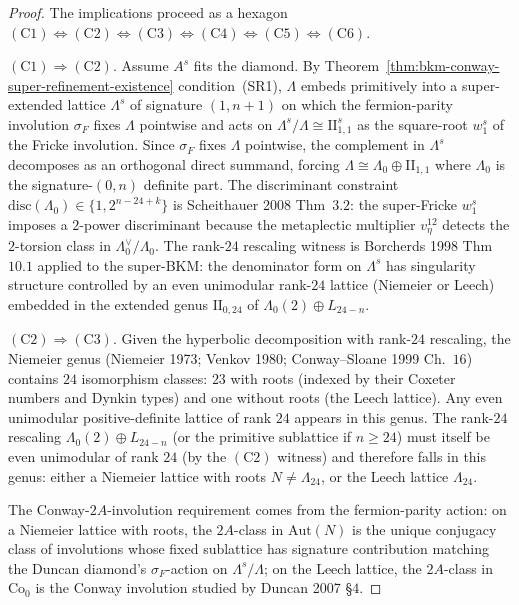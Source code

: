 \begin{proof}[Proof]
The implications proceed as a hexagon
$(\mathrm{C}1)\Leftrightarrow(\mathrm{C}2)\Leftrightarrow(\mathrm{C}3)\Leftrightarrow(\mathrm{C}4)\Leftrightarrow(\mathrm{C}5)\Leftrightarrow(\mathrm{C}6)$.

$(\mathrm{C}1)\Rightarrow(\mathrm{C}2)$.
Assume $A^{s}$ fits the diamond. By
Theorem~\ref{thm:bkm-conway-super-refinement-existence} condition~(SR1),
$\Lambda$ embeds primitively into a super-extended lattice
$\Lambda^{s}$ of signature $(1, n+1)$ on which the fermion-parity
involution $\sigma_F$ fixes $\Lambda$ pointwise and acts on
$\Lambda^{s}/\Lambda \cong \mathrm{II}_{1,1}^{s}$ as the square-root
$w_1^{s}$ of the Fricke involution. Since $\sigma_F$ fixes $\Lambda$
pointwise, the complement in $\Lambda^{s}$ decomposes as an orthogonal
direct summand, forcing $\Lambda \cong \Lambda_0\oplus\mathrm{II}_{1,1}$
where $\Lambda_0$ is the signature-$(0, n)$ definite part. The
discriminant constraint $\mathrm{disc}(\Lambda_0)\in\{1, 2^{n-24+k}\}$
is Scheithauer 2008 Thm~$3.2$: the super-Fricke $w_1^{s}$ imposes a
$2$-power discriminant because the metaplectic multiplier $v_\eta^{12}$
detects the $2$-torsion class in $\Lambda_0^\vee/\Lambda_0$.
The rank-$24$ rescaling witness is Borcherds 1998 Thm~$10.1$ applied
to the super-BKM: the denominator form on $\Lambda^{s}$ has
singularity structure controlled by an even unimodular rank-$24$
lattice (Niemeier or Leech) embedded in the extended genus
$\mathrm{II}_{0, 24}$ of $\Lambda_0(2)\oplus L_{24-n}$.

$(\mathrm{C}2)\Rightarrow(\mathrm{C}3)$.
Given the hyperbolic decomposition with rank-$24$ rescaling, the
Niemeier genus
(Niemeier 1973; Venkov 1980; Conway--Sloane 1999 Ch.~$16$) contains
$24$ isomorphism classes: $23$ with roots (indexed by their Coxeter
numbers and Dynkin types) and one without roots (the Leech lattice).
Any even unimodular positive-definite lattice of rank $24$ appears in
this genus. The rank-$24$ rescaling $\Lambda_0(2)\oplus L_{24-n}$
(or the primitive sublattice if $n \geq 24$) must itself be even
unimodular of rank $24$ (by the $(\mathrm{C}2)$ witness) and therefore
falls in this genus: either a Niemeier lattice with roots
$N\neq\Lambda_{24}$, or the Leech lattice $\Lambda_{24}$.

The Conway-$2A$-involution requirement comes from the fermion-parity
action: on a Niemeier lattice with roots, the $2A$-class in
$\mathrm{Aut}(N)$ is the unique conjugacy class of involutions whose
fixed sublattice has signature contribution matching the Duncan
diamond's $\sigma_F$-action on $\Lambda^{s}/\Lambda$; on the Leech
lattice, the $2A$-class in $\mathrm{Co}_0$ is the Conway involution
studied by Duncan 2007 \S$4$.


\end{proof}
